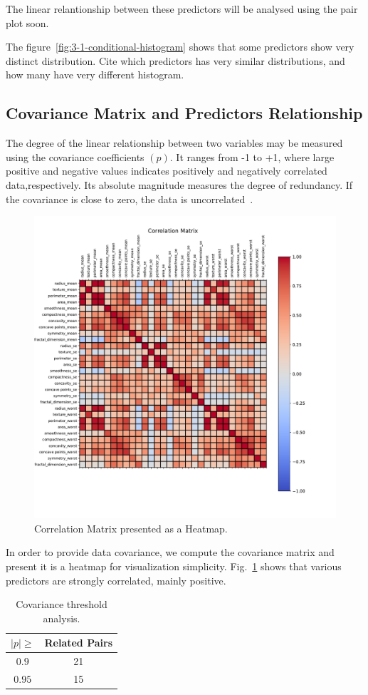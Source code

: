 \documentclass[conference]{IEEEtran}
\newcommand{\reviewUrgent}[1]{{\color{red} #1}} %
\begin{document}
The linear relantionship between these predictors will be analysed using the pair 
plot soon.

The figure~\ref{fig:3-1-conditional-histogram} shows that some predictors show very distinct distribution. \reviewUrgent{Cite which predictors has very similar distributions, and how many have very different histogram.}

\subsection{Covariance Matrix and Predictors Relationship}

The degree of the linear relationship between two variables may be measured using the covariance coefficients $(p)$. It ranges from -1 to +1, where large positive and negative values indicates positively and negatively correlated data,respectively. Its absolute magnitude measures the degree of redundancy. If the covariance is close to zero, the data is uncorrelated~\cite{Kuhn2013}.

\begin{figure}[htbp!]
    \centerline{\includegraphics[width=0.5 \textwidth]{../../code/hw1/figures/4-3-correlation.pdf}}
    \caption{Correlation Matrix presented as a Heatmap.}
    \label{fig:4-3-correlation}
\end{figure}

In order to provide data covariance, we compute the covariance matrix and present it is a heatmap for visualization simplicity. Fig.~\ref{fig:4-3-correlation} shows that various predictors are strongly correlated, mainly positive.

\begin{table}[htbp]
\caption{Covariance threshold analysis.}
\begin{center}
\begin{tabular}{|c|c|}
        \hline 
        $|p| \geq$ & Related Pairs\\
        \hline
        $0.9$ & 21\\
        \hline
        $0.95$ & 15 \\
        \hline
\end{tabular}
\label{tab:Covariance}
\end{center}
\end{table}
\end{document}
